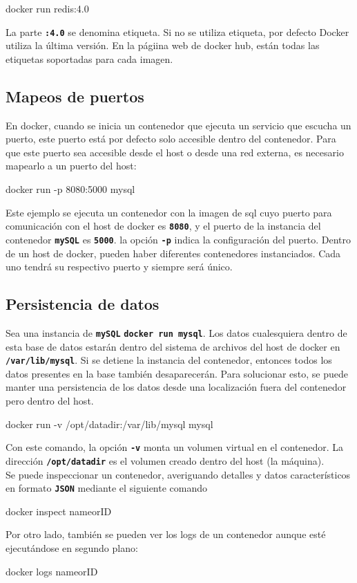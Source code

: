 \begin{VerbatimBold}
docker run redis:4.0
\end{VerbatimBold}

La parte \texttt{\textbf{:4.0}} se denomina etiqueta. Si no se utiliza etiqueta, por defecto Docker utiliza la última versión. En la págiina web de docker hub, están todas las etiquetas soportadas para cada imagen. 

\subsection{Mapeos de puertos}

En docker, cuando se inicia un contenedor que ejecuta un servicio que escucha un puerto, este puerto está por defecto solo accesible dentro del contenedor. Para que este puerto sea accesible desde el host o desde una red externa, es necesario mapearlo a un puerto del host:

\begin{VerbatimBold}
docker run -p 8080:5000 mysql
\end{VerbatimBold}
Este ejemplo se ejecuta un contenedor con la imagen de sql cuyo puerto para comunicación con el host de docker es \texttt{\textbf{8080}}, y el puerto de la instancia del contenedor \texttt{\textbf{mySQL}} es \texttt{\textbf{5000}}. la opción \texttt{\textbf{-p}} indica la configuración del puerto. Dentro de un host de docker, pueden haber diferentes contenedores instanciados. Cada uno tendrá su respectivo puerto y siempre será único.

\subsection{Persistencia de datos} Sea una instancia de \texttt{\textbf{mySQL}} \texttt{\textbf{docker run mysql}}. Los datos cualesquiera dentro de esta base de datos estarán dentro del sistema de archivos del host de docker en \texttt{\textbf{/var/lib/mysql}}. Si se detiene la instancia del contenedor, entonces todos los datos presentes en la base también desaparecerán. Para solucionar esto, se puede manter una persistencia de los datos desde una localización fuera del contenedor pero dentro del host. 

\begin{VerbatimBold}
docker run -v /opt/datadir:/var/lib/mysql mysql
\end{VerbatimBold}

Con este comando, la opción \texttt{\textbf{-v}} monta un volumen virtual en el contenedor. La dirección \texttt{\textbf{/opt/datadir}} es el volumen creado dentro del host (la máquina). \\
Se puede inspeccionar un contenedor, averiguando detalles y datos característicos en formato \texttt{\textbf{JSON}} mediante el siguiente comando
\begin{VerbatimBold}
docker inspect nameorID
\end{VerbatimBold}

Por otro lado, también se pueden ver los logs de un contenedor aunque esté ejecutándose en segundo plano:
\begin{VerbatimBold}
docker logs nameorID
\end{VerbatimBold}